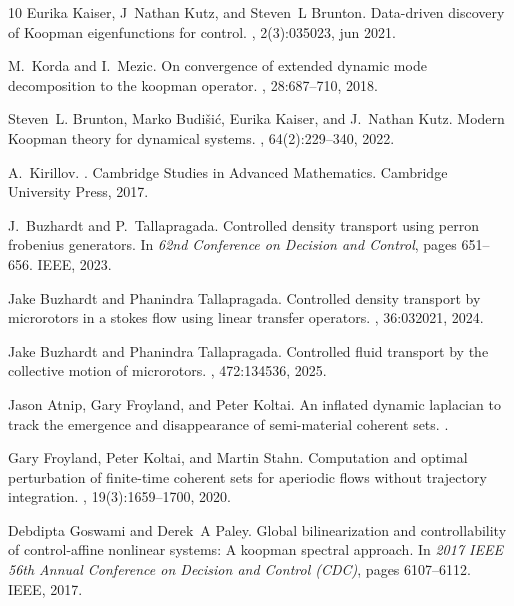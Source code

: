 \documentclass[pdflatex,sn-mathphys]{sn-jnl}%
\theoremstyle{thmstyleone}%
\theoremstyle{thmstyletwo}%
\theoremstyle{thmstylethree}%
\begin{document}
\begin{thebibliography}{10}
Eurika Kaiser, J~Nathan Kutz, and Steven~L Brunton.
\newblock Data-driven discovery of {Koopman} eigenfunctions for control.
, 2(3):035023, jun 2021.

M.~Korda and I.~Mezic.
\newblock On convergence of extended dynamic mode decomposition to the koopman operator.
, 28:687--710, 2018.

Steven~L. Brunton, Marko Budi\v{s}i\'{c}, Eurika Kaiser, and J.~Nathan Kutz.
\newblock Modern {K}oopman theory for dynamical systems.
, 64(2):229--340, 2022.

A.~Kirillov.
.
\newblock Cambridge Studies in Advanced Mathematics. Cambridge University Press, 2017.

J.~Buzhardt and P.~Tallapragada.
\newblock Controlled density transport using perron frobenius generators.
\newblock In {\em 62nd Conference on Decision and Control}, pages 651--656. IEEE, 2023.

Jake Buzhardt and Phanindra Tallapragada.
\newblock Controlled density transport by microrotors in a stokes flow using linear transfer operators.
, 36:032021, 2024.

Jake Buzhardt and Phanindra Tallapragada.
\newblock Controlled fluid transport by the collective motion of microrotors.
, 472:134536, 2025.

Jason Atnip, Gary Froyland, and Peter Koltai.
\newblock An inflated dynamic laplacian to track the emergence and disappearance of semi-material coherent sets.
.

Gary Froyland, Peter Koltai, and Martin Stahn.
\newblock Computation and optimal perturbation of finite-time coherent sets for aperiodic flows without trajectory integration.
, 19(3):1659--1700, 2020.

Debdipta Goswami and Derek~A Paley.
\newblock Global bilinearization and controllability of control-affine nonlinear systems: A koopman spectral approach.
\newblock In {\em 2017 IEEE 56th Annual Conference on Decision and Control (CDC)}, pages 6107--6112. IEEE, 2017.


\end{thebibliography}
\end{document}

